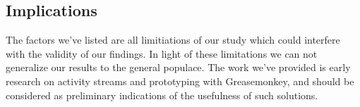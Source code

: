 \subsection{Implications}

The factors we've listed are all limitiations of our study which could
interfere with the validity of our findings.
In light of these limitations we can not generalize
our results to the general \urort{} populace. The work we've
provided is early research on activity streams and prototyping with
Greasemonkey, and should be considered as preliminary indications of the
usefulness of such solutions.

